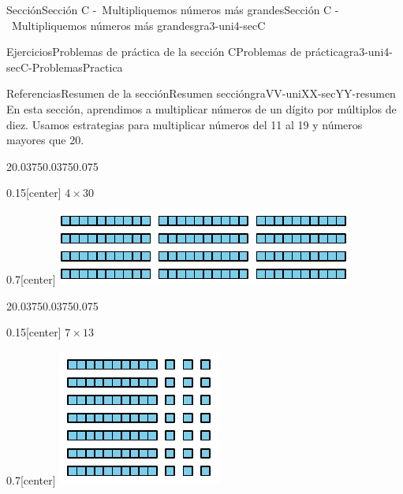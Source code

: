\documentclass[twoside,10pt,]{article}
\begin{document}
\begin{sectionptx}{Sección}{Sección C -~Multipliquemos números más grandes}{}{Sección C -~Multipliquemos números más grandes}{}{}{gra3-uni4-secC}
\begin{exercises-subsection}{Ejercicios}{Problemas de práctica de la sección C}{}{Problemas de práctica}{}{}{gra3-uni4-secC-ProblemasPractica}
\end{exercises-subsection}
%
%
\typeout{************************************************}
\typeout{************************************************}
%
\begin{references-subsection}{Referencias}{Resumen de la sección}{}{Resumen sección}{}{}{graVV-uniXX-secYY-resumen}
En esta sección, aprendimos a multiplicar números de un dígito por múltiplos de diez. Usamos estrategias para multiplicar números del 11 al 19 y números mayores que 20.%
\begin{sidebyside}{2}{0.0375}{0.0375}{0.075}%
\begin{sbspanel}{0.15}[center]%
\(4\times 30\)%
\end{sbspanel}%
\begin{sbspanel}{0.7}[center]%
\includegraphics[width=\linewidth]{external/svg-source/tikz-file-147742.pdf}
\end{sbspanel}%
\end{sidebyside}%
\begin{sidebyside}{2}{0.0375}{0.0375}{0.075}%
\begin{sbspanel}{0.15}[center]%
\(7\times 13\)%
\end{sbspanel}%
\begin{sbspanel}{0.7}[center]%
\includegraphics[width=\linewidth]{external/svg-source/tikz-file-141823.pdf}

\end{sbspanel}
\end{sidebyside}
\end{references-subsection}
\end{sectionptx}
\end{document}
